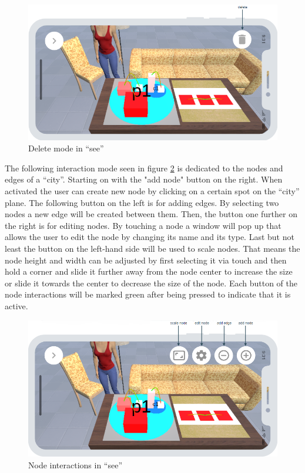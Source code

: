 \begin{figure}[htb]
    \centering
    \includegraphics[width=1\textwidth]{Concept/img/menu2.png}
    \caption{Delete mode in \enquote{\gls{see}}}\label{fig:delete}
\end{figure}

The following interaction mode seen in figure \ref{fig:nodes} is dedicated to the nodes and edges of a \enquote{\gls{city}}.
Starting on with the "add node" button on the right.
When activated the user can create new node by clicking on a certain spot on the \enquote{\gls{city}} plane. 
The following button on the left is for adding edges.
By selecting two nodes a new edge will be created between them. 
Then, the button one further on the right is for editing nodes.
By touching a node a window will pop up that allows the user to edit the node by changing its name and its type.
Last but not least the button on the left-hand side will be used to scale nodes.
That means the node height and width can be adjusted by first selecting it via touch and then hold a corner and slide it further away from the node center to increase the size or slide it towards the center to decrease the size of the node.
Each button of the node interactions will be marked green after being pressed to indicate that it is active.

\begin{figure}[htb]
    \centering
    \includegraphics[width=1\textwidth]{Concept/img/menu3.png}
    \caption{Node interactions in \enquote{\gls{see}}}\label{fig:nodes}
\end{figure}


